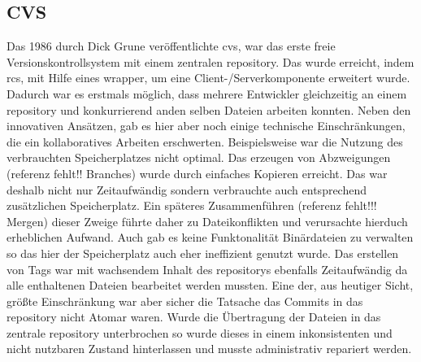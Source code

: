 \subsection{CVS}\label{sec:cvs}
Das 1986 durch Dick Grune veröffentlichte \acrfull{cvs}, war das erste freie
Versionskontrollsystem mit einem zentralen \gls{repository}. Das wurde
erreicht, indem \acrshort{rcs}, mit Hilfe eines \gls{wrapper}, um eine
Client-/Serverkomponente erweitert wurde. Dadurch war es erstmals möglich, dass
mehrere Entwickler gleichzeitig an einem \gls{repository} und konkurrierend
anden selben Dateien arbeiten konnten. Neben den innovativen Ansätzen, gab es
hier aber noch einige technische Einschränkungen, die ein kollaboratives
Arbeiten erschwerten. Beispielsweise war die Nutzung des verbrauchten
Speicherplatzes nicht optimal. Das erzeugen von Abzweigungen (referenz fehlt!!
Branches) wurde durch einfaches Kopieren erreicht. Das war deshalb nicht nur
Zeitaufwändig sondern verbrauchte auch entsprechend zusätzlichen Speicherplatz.
Ein späteres Zusammenführen (referenz fehlt!!! Mergen) dieser Zweige führte
daher zu Dateikonflikten und verursachte hierduch erheblichen Aufwand. Auch gab
es keine Funktonalität Binärdateien zu verwalten so das hier der Speicherplatz
auch eher ineffizient genutzt wurde. Das erstellen von Tags war mit wachsendem
Inhalt des \glspl{repository} ebenfalls Zeitaufwändig da alle enthaltenen
Dateien bearbeitet werden mussten. Eine der, aus heutiger Sicht, größte
Einschränkung war aber sicher die Tatsache das Commits in das \gls{repository}
nicht Atomar waren. Wurde die Übertragung der Dateien in das zentrale
\gls{repository} unterbrochen so wurde dieses in einem inkonsistenten und nicht
nutzbaren Zustand hinterlassen und musste administrativ repariert werden.
\cite[s.~382-383]{cd}

